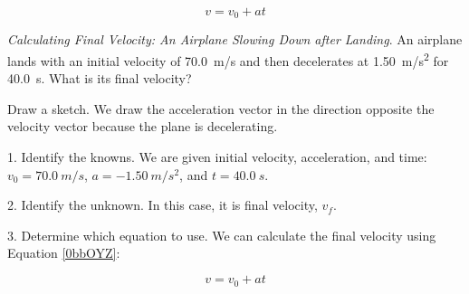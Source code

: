 \documentclass[dvipsnames]{article}
\begin{document}
\begin{equation} \label{0bbOYZ}
    v = v_0 + a t
\end{equation}

\cyanhrule

\vspace{1em}

\begin{example}
    \textit{Calculating Final Velocity: An Airplane Slowing Down after Landing}. An airplane lands with an initial velocity of \SI{70.0}{m/s} and then decelerates at \SI{1.50}{m/s^2} for \SI{40.0}{s}. What is its final velocity?
\end{example}

\Solution Draw a sketch. We draw the acceleration vector in the direction opposite the velocity vector because the plane is decelerating.


\begin{center}
\end{center}

1. Identify the knowns. We are given initial velocity, acceleration, and time: $v_0 = \SI{70.0}{m/s}$, $a = -\SI{1.50}{m/s^2}$, and $t = \SI{40.0}{s}$. 

\vspace{1ex}

2. Identify the unknown. In this case, it is final velocity, $v_f$.

\vspace{1ex}

3. Determine which equation to use. We can calculate the final velocity using Equation \eqref{0bbOYZ}:

\begin{equation*}
    v = v_0 + at
\end{equation*}
\end{document}
